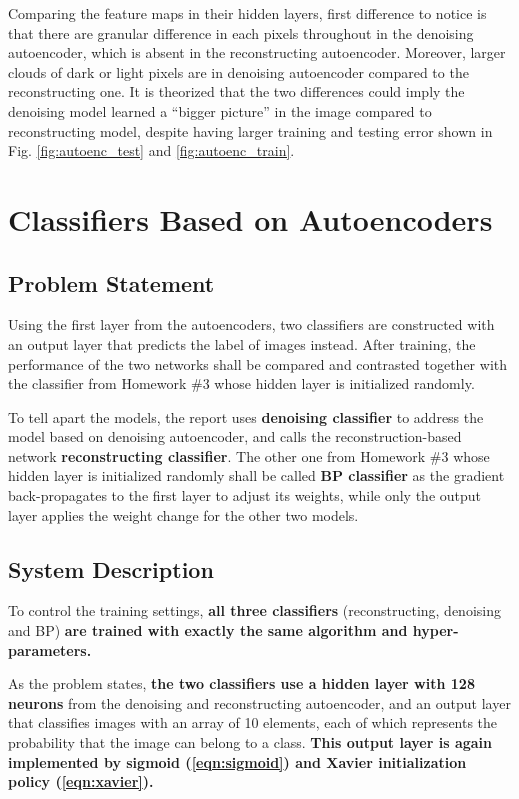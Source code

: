 \documentclass[11pt,titlepage]{article}
\begin{document}
Comparing the feature maps in their hidden layers, first difference to notice is that there are granular difference in each pixels throughout in the denoising autoencoder, which is absent in the reconstructing autoencoder. Moreover, larger clouds of dark or light pixels are in denoising autoencoder compared to the reconstructing one. It is theorized that the two differences could imply the denoising model learned a ``bigger picture'' in the image compared to reconstructing model, despite having larger training and testing error shown in Fig. \ref{fig:autoenc_test} and \ref{fig:autoenc_train}.

\newpage
\section{Classifiers Based on Autoencoders}
\subsection{Problem Statement}

Using the first layer from the autoencoders, two classifiers are constructed with an output layer that predicts the label of images instead. After training, the performance of the two networks shall be compared and contrasted together with the classifier from Homework \#3 whose hidden layer is initialized randomly.

To tell apart the models, the report uses \textbf{denoising classifier} to address the model based on denoising autoencoder, and calls the reconstruction-based network \textbf{reconstructing classifier}. The other one from Homework \#3 whose hidden layer is initialized randomly shall be called \textbf{BP classifier} as the gradient back-propagates to the first layer to adjust its weights, while only the output layer applies the weight change for the other two models.







\subsection{System Description}
To control the training settings, \textbf{all three classifiers} (reconstructing, denoising and BP) \textbf{are trained with exactly the same algorithm and hyper-parameters. }

As the problem states, \textbf{the two classifiers use a hidden layer with 128 neurons} from the denoising and reconstructing autoencoder, and an output layer that classifies images with an array of 10 elements, each of which represents the probability that the image can belong to a class. \textbf{This output layer is again implemented by sigmoid (\ref{eqn:sigmoid}) and Xavier initialization policy (\ref{eqn:xavier}).} 
\end{document}
